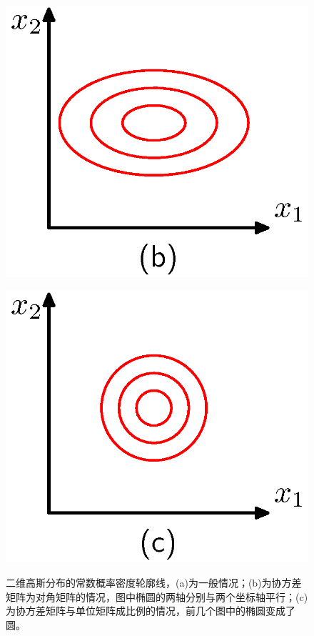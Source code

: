 \documentclass[b5paper]{book}
\numberwithin{equation}{chapter}
\begin{document}
{\begin{figure}[ht]
\begin{minipage}[t]{0.3\linewidth}
		\centering
		\includegraphics[scale=0.8]{Images/2-8b.png}
		\label{fig:2-8b}
		\end{minipage}
		\begin{minipage}[t]{0.3\linewidth}
		\centering
		\includegraphics[scale=0.8]{Images/2-8c.png}
		\label{fig:2-8c}
		\end{minipage}
		\caption{二维高斯分布的常数概率密度轮廓线，(a)为一般情况；(b)为协方差矩阵为对角矩阵的情况，图中椭圆的两轴分别与两个坐标轴平行；(c)为协方差矩阵与单位矩阵成比例的情况，前几个图中的椭圆变成了圆。}

\end{figure}}
\end{document}
